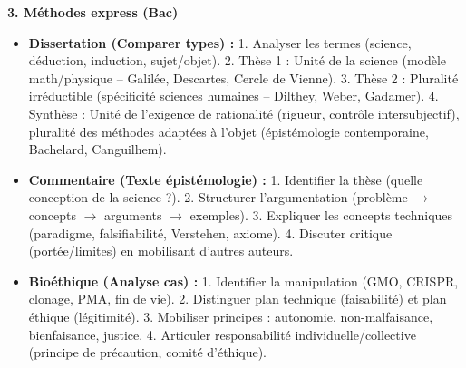 \documentclass[11pt]{article}
\begin{document}
\begin{bilan}
\textbf{3. Méthodes express (Bac)}
\begin{itemize}
  \item \textbf{Dissertation (Comparer types) :} 1. Analyser les termes (science, déduction, induction, sujet/objet). 2. Thèse 1 : Unité de la science (modèle math/physique -- Galilée, Descartes, Cercle de Vienne). 3. Thèse 2 : Pluralité irréductible (spécificité sciences humaines -- Dilthey, Weber, Gadamer). 4. Synthèse : Unité de l'exigence de rationalité (rigueur, contrôle intersubjectif), pluralité des méthodes adaptées à l'objet (épistémologie contemporaine, Bachelard, Canguilhem).
  \item \textbf{Commentaire (Texte épistémologie) :} 1. Identifier la thèse (quelle conception de la science ?). 2. Structurer l'argumentation (problème $\rightarrow$ concepts $\rightarrow$ arguments $\rightarrow$ exemples). 3. Expliquer les concepts techniques (paradigme, falsifiabilité, Verstehen, axiome). 4. Discuter critique (portée/limites) en mobilisant d'autres auteurs.
  \item \textbf{Bioéthique (Analyse cas) :} 1. Identifier la manipulation (GMO, CRISPR, clonage, PMA, fin de vie). 2. Distinguer plan technique (faisabilité) et plan éthique (légitimité). 3. Mobiliser principes : autonomie, non-malfaisance, bienfaisance, justice. 4. Articuler responsabilité individuelle/collective (principe de précaution, comité d'éthique).
\end{itemize}

\end{bilan}
\end{document}
